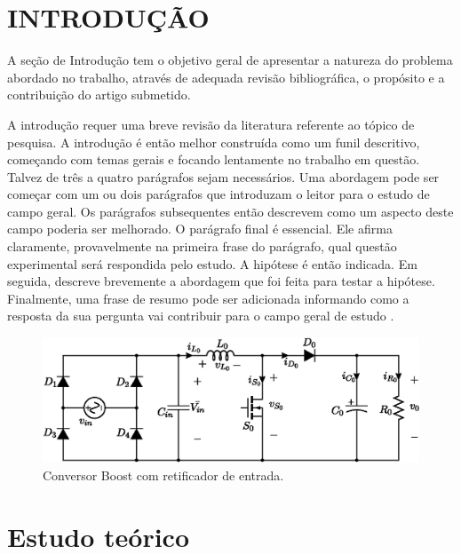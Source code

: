 %


\section{INTRODUÇÃO}


A seção de Introdução tem o objetivo geral de apresentar a natureza do problema abordado no trabalho, através de adequada revisão bibliográfica, o propósito e a contribuição do artigo submetido.

A introdução requer uma breve revisão da literatura referente ao tópico de pesquisa. A introdução é então melhor construída como um funil descritivo, começando com temas gerais e focando lentamente no trabalho em questão. Talvez de três a quatro parágrafos sejam necessários. Uma abordagem pode ser começar com um ou dois parágrafos que introduzam o leitor para o estudo de campo geral. Os parágrafos subsequentes então descrevem como um aspecto deste campo poderia ser melhorado. O parágrafo final é essencial. Ele afirma claramente, provavelmente na primeira frase do parágrafo, qual questão experimental será respondida pelo estudo. A hipótese é então indicada. Em seguida, descreve brevemente a abordagem que foi feita para testar a hipótese. Finalmente, uma frase de resumo pode ser adicionada informando como a resposta da sua pergunta vai contribuir para o campo geral de estudo .

\begin{figure}[!h]
	\centering
	\includegraphics[width=1\linewidth]{Figs/RET-Boost}
	\caption{Conversor Boost com retificador de entrada.}
	\label{fig:ret-boost}
\end{figure}



\section{Estudo teórico}

